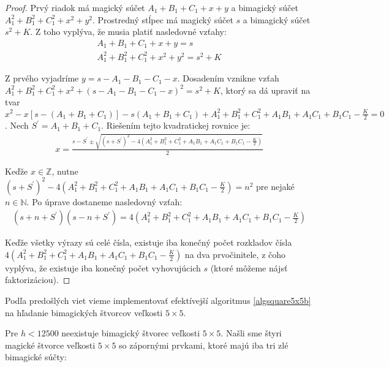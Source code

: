 \begin{proof} Prvý riadok má magický súčet $A_1 + B_1 + C_1 + x + y$ a bimagický súčet $A_1^2 + B_1^2 + C_1^2 + x^2 + y^2$. Prostredný stĺpec má magický súčet $s$ a bimagický súčet $s^2 + K$. Z toho vyplýva, že musia platiť nasledovné vzťahy:
\begin{gather*}
A_1 + B_1 + C_1 + x + y = s \\
A_1^2 + B_1^2 + C_1^2 + x^2 + y^2 = s^2 + K
\end{gather*}

Z prvého vyjadríme $y = s - A_1 - B_1 - C_1 - x$. Dosadením vznikne vzťah $A_1^2 + B_1^2 + C_1^2 + x^2 + (s - A_1 - B_1 - C_1 - x)^2 = s^2 + K$, ktorý sa dá upraviť na tvar $x^2 - x[s - (A_1 + B_1 + C_1)] - s(A_1 + B_1 + C_1) + A_1^2 + B_1^2 + C_1^2 + A_1 B_1 + A_1 C_1 + B_1 C_1 - \frac{K}{2} = 0$. Nech $S^\prime = A_1 + B_1 + C_1$. Riešením tejto kvadratickej rovnice je:
\begin{gather*}
x = \frac{s - S^\prime \pm \sqrt{(s + S^\prime)^2 - 4(A_1^2 + B_1^2 + C_1^2 + A_1 B_1 + A_1 C_1 + B_1 C_1 - \frac{K}{2})}}{2}
\end{gather*}

Keďže $x \in \mathbb{Z}$, nutne $(s + S^\prime)^2 - 4(A_1^2 + B_1^2 + C_1^2 + A_1 B_1 + A_1 C_1 + B_1 C_1 - \frac{K}{2}) = n^2$ pre nejaké $n \in \mathbb{N}$. Po úprave dostaneme nasledovný vzťah:
\begin{gather*}
(s + n + S^\prime)(s - n + S^\prime) = 4(A_1^2 + B_1^2 + C_1^2 + A_1 B_1 + A_1 C_1 + B_1 C_1 - \frac{K}{2})
\end{gather*}

Keďže všetky výrazy sú celé čísla, existuje iba konečný počet rozkladov čísla $4(A_1^2 + B_1^2 + C_1^2 + A_1 B_1 + A_1 C_1 + B_1 C_1 - \frac{K}{2})$ na dva prvočinitele, z čoho vyplýva, že existuje iba konečný počet vyhovujúcich $s$ (ktoré môžeme nájsť faktorizáciou).
\end{proof}

Podľa predošlých viet vieme implementovať efektívejší algoritmus \ref{algsquare5x5b} na hľadanie bimagických štvorcov veľkosti $5 \times 5$. 

\begin{result} Pre $h < 12500$ neexistuje bimagický štvorec veľkosti $5 \times 5$. Našli sme štyri magické štvorce veľkosti $5 \times 5$ so zápornými prvkami, ktoré majú iba tri zlé bimagické súčty:
\end{result}

